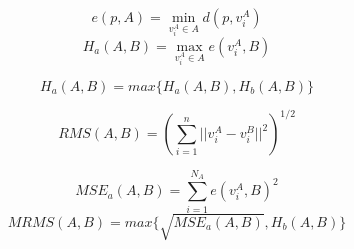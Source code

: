 \begin{equation}
e(p, A) = \min_{v^A_i\in A}{d(p, v^A_i)}
\end{equation}
\begin{equation}
H_a(A,B) = \max_{v^A_i\in A}{e(v^A_i, B)}
\end{equation}

\begin{equation}
H_a(A,B) = max\{ H_a(A,B), H_b(A,B) \}
\end{equation}

\begin{equation}
RMS(A,B) = (\sum_{i=1}^n{||v^A_i-v^B_i||^2})^{1/2}
\end{equation}

\begin{equation}
MSE_a(A,B) = \sum_{i=1}^{N_A}{e(v^A_i, B)^2}
\end{equation}
\begin{equation}
MRMS(A,B) = max\{ \sqrt{MSE_a(A,B)}, H_b(A,B) \}
\end{equation}
